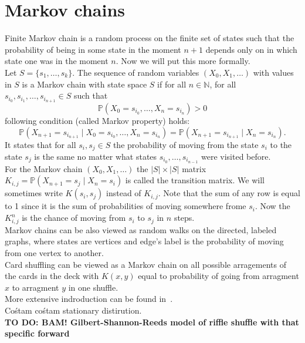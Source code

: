 \documentclass[a4paper, 12pt]{report}
\newcommand{\todo}[1]{\hfill \break \textbf{\Huge TO DO: #1 \hfill \break}\normalsize}
\begin{document}
\chapter{Markov chains}
\setcounter{page}{5}
Finite Markov chain is a random process on the finite set of states such that
the probability of being in some state in the moment $n+1$ depends only on in which state one was
in the moment $n$. Now we will put this more formally.\\
Let $S = \{s_1, \dots, s_k\}$. The sequence of random variables $(X_0, X_1, \dots)$ with values in $S$
is a Markov chain with state space $S$ if for all $n \in \mathbb{N}$,
for all $s_{i_0}, s_{i_1}, \dots, s_{i_{n+1}} \in S$ such that
\begin{equation*}
\mathbb{P}(X_0 = s_{i_0}, \dots, X_n = s_{i_n}) > 0
\end{equation*}
following condition (called Markov property) holds:
\begin{equation}
\mathbb{P}(X_{n+1} = s_{i_{n+1}} \mid X_0 = s_{i_0}, \dots, X_n = s_{i_n}) =
\mathbb{P}(X_{n+1} = s_{i_{n+1}} \mid X_n = s_{i_n}).
\end{equation}
It states that for all $s_i, s_j \in S$ the probability of moving from the state
$s_i$ to the state $s_j$ is the same no matter what states $s_{i_0}, \dots, s_{i_{n-1}}$
were visited before. \\
For the Markov chain $(X_0, X_1, \dots)$ the $|S| \times |S|$ matrix
$K_{i,j} = \mathbb{P}(X_{n+1} = s_j \mid X_n = s_i)$ is called the transition matrix. We will sometimes
write $K(s_i, s_j)$ instead of $K_{i,j}$. Note that the sum of
any row is equal to 1 since it is the sum of probabilities of moving somewhere frome $s_i$.
Now the $K^n_{i,j}$ is the chance of moving from $s_i$ to $s_j$ in $n$ steps. \\
Markov chains can be also viewed as random walks on the directed, labeled graphs, where states are vertices
and edge's label is the probability of moving from one vertex to another. \\
Card shuffling can be viewed as a Markov chain on all possible arragements of the cards
in the deck with $K(x,y)$ equal to probability of going from arragment $x$ to arragment $y$ in one shuffle. 
\\ More extensive indroduction can be found in~\cite{LePeWi}. \\
Cośtam cośtam stationary distirution. \\
\todo{BAM! Gilbert-Shannon-Reeds model of riffle shuffle with that specific forward}
\end{document}
